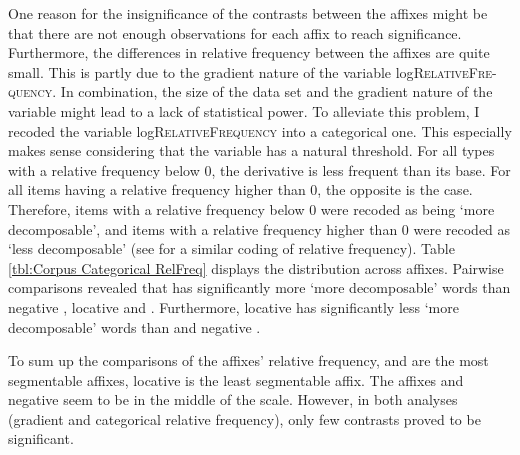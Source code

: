 One reason for the insignificance of the contrasts between the affixes might be that there are not enough observations for each affix to reach significance. Furthermore, the differences in relative frequency between the affixes are quite small. This is partly due to the gradient nature of the variable log\textsc{RelativeFre-quency}. In combination, the size of the data set and the gradient nature of the variable might lead to a lack of statistical power. 
To alleviate this problem, I recoded the variable log\textsc{RelativeFrequency} into a categorical one. This especially makes sense considering that the variable has a natural threshold. For all types with a relative frequency below 0, the derivative is less frequent than its base. For all items having a relative frequency higher than 0, the opposite is the case. Therefore, items with a relative frequency below 0 were recoded as being `more decomposable', and items with a relative frequency higher than 0 were recoded as `less decomposable' (see \citealt{Hay.2001,Collie.2008} for a similar coding of relative frequency). Table \ref{tbl:Corpus Categorical RelFreq} displays the distribution across affixes.
Pairwise comparisons revealed that  has significantly more `more decomposable' words  than negative , locative  and . Furthermore, locative  has significantly less  `more decomposable' words than  and negative . 







To sum up the comparisons of the affixes' relative frequency,  and  are the most segmentable affixes, locative  is the least segmentable affix. The affixes  and negative  seem to be in the middle of the scale. However, in both analyses (gradient and categorical relative frequency), only few contrasts proved to be significant.


\clearpage



